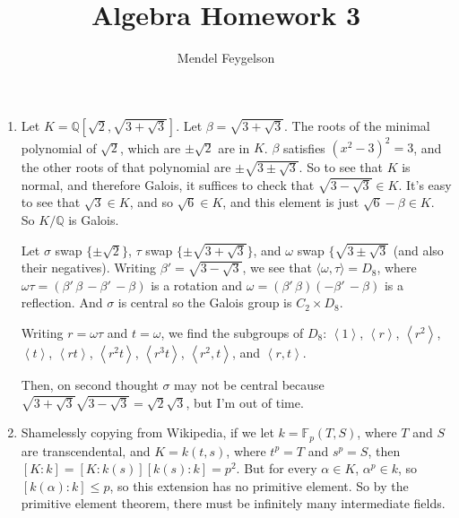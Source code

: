\documentclass{article}
\title{Algebra Homework 3}
\author{Mendel Feygelson}
\newcommand\QQ{\mathbb Q}
\newcommand\FF{\mathbb F}
\renewcommand\a[1]{\left\langle#1\right\rangle}
\begin{document}
\maketitle
\begin{enumerate}

   \item Let $K = \QQ[\sqrt2,\sqrt{3+\sqrt3}]$. Let $\beta = \sqrt{3+\sqrt3}$.
      The roots of the minimal polynomial of $\sqrt2$, which are $\pm\sqrt2$ are
      in $K$. $\beta$ satisfies $(x^2-3)^2=3$, and the other roots of that
      polynomial are $\pm\sqrt{3\pm\sqrt3}$. So to see that $K$ is normal, and
      therefore Galois, it suffices to check that $\sqrt{3-\sqrt3} \in K$. It's
      easy to see that $\sqrt3 \in K$, and so $\sqrt6 \in K$, and this element
      is just $\sqrt6 - \beta \in K$. So $K/\QQ$ is Galois.

      Let $\sigma$ swap $\{\pm\sqrt2\}$, $\tau$ swap $\{\pm\sqrt{3+\sqrt3}\}$,
      and $\omega$ swap $\{\sqrt{3\pm\sqrt3}$ (and also their negatives).
      Writing $\beta' = \sqrt{3-\sqrt3}$, we see that $\langle\omega,\tau\rangle
      = D_8$, where $\omega\tau = (\beta'\,\beta\,-\beta'\,-\beta)$ is a
      rotation and $\omega=(\beta'\,\beta)(-\beta'\,-\beta)$ is a reflection.
      And $\sigma$ is central so the Galois group is $C_2 \times D_8$.
      
      Writing $r = \omega\tau$ and $t = \omega$, we find the subgroups of $D_8$:
      $\a1$, $\a{r}$, $\a{r^2}$, $\a{t}$, $\a{rt}$, $\a{r^2t}$, $\a{r^3t}$,
      $\a{r^2,t}$, and $\a{r,t}$.
      
      Then, on second thought $\sigma$ may not be central because
      $\sqrt{3+\sqrt3}\sqrt{3-\sqrt3}=\sqrt2\sqrt3$, but I'm out of time.

   \item Shamelessly copying from Wikipedia, if we let $k = \FF_p(T,S)$, where
      $T$ and $S$ are transcendental, and $K = k(t,s)$, where $t^p = T$ and
      $s^p = S$, then $[K:k] = [K:k(s)][k(s):k] = p^2$. But for every $\alpha
      \in K$, $\alpha^p \in k$, so $[k(\alpha):k] \leq p$, so this extension has
      no primitive element. So by the primitive element theorem, there must be
      infinitely many intermediate fields.


\end{enumerate}
\end{document}
